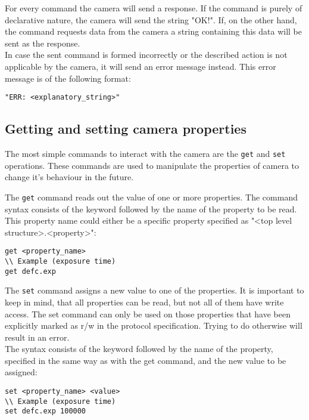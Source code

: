 For every command the camera will send a response. If the command is purely of declarative nature, the camera will send the string "OK!". If, on the other hand, the command requests data from the camera a string containing this data will be sent as the response.\\
In case the sent command is formed incorrectly or the described action is not applicable by the camera, it will send an error message instead. This error message is of the following format:
\begin{lstlisting}
"ERR: <explanatory_string>"
\end{lstlisting}

\subsection{Getting and setting camera properties} \label{sec:phgetset}
The most simple commands to interact with the camera are the \texttt{get} and \texttt{set} operations. These commands are used to manipulate the properties of camera to change it's behaviour in the future.\par
The \texttt{get} command reads out the value of one or more properties. The command syntax consists of the keyword followed by the name of the property to be read. This property name could either be a specific property specified as "<top level structure>.<property>":
\begin{lstlisting}
get <property_name>
\\ Example (exposure time)
get defc.exp
\end{lstlisting}
The \texttt{set} command assigns a new value to one of the properties. It is important to keep in mind, that all properties can be read, but not all of them have write access. The set command can only be used on those properties that have been explicitly marked as r/w in the protocol specification. Trying to do otherwise will result in an error.\\
The syntax consists of the keyword followed by the name of the property, specified in the same way as with the get command, and the new value to be assigned: 
\begin{lstlisting}
set <property_name> <value>
\\ Example (exposure time)
set defc.exp 100000
\end{lstlisting}

